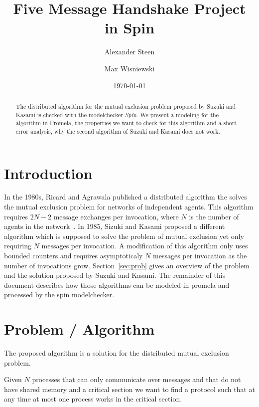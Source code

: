 \documentclass{llncs}
\title{Five Message Handshake Project in Spin}
\author{Alexander Steen \and Max Wisniewski}
\date{\today}
\institute{Institut f\"ur Informatik, FU Berlin}
\begin{document}
\maketitle

\begin{abstract}
The distributed algorithm for the mutual exclusion problem proposed by Suzuki and Kasami \cite{Suzuki:1985:DME:6110.214406} is checked
with the modelchecker \emph{Spin}. We present a modeling for the algorithm in Promela, the properties we want
to check for this algorithm and a short error analysis, why the second algorithm of Suzuki and Kasami does not work.
\end{abstract}



\section{Introduction}

In the 1980s, Ricard and Agrawala published a distributed algorithm the solves the mutual exclusion
problem for networks of independent agents. This algorithm requires $2N-2$ message exchanges per
invocation, where $N$ is the number of agents in the network~\cite{Ricart:1981:OAM:358527.358537}.
In 1985, Sizuki and Kasami proposed a different algorithm which is supposed to solve the problem of 
mutual exclusion yet only requiring $N$ messages per invocation. A modification of this algorithm
only uses bounded counters and requires asymptoticaly $N$ messages per invocation as the number of
invocations grow.
Section~\ref{sec:prob} gives an overview of the problem and the solution proposed by Suzuki and Kasami.
The remainder of this document describes how those algorithms can be modeled in promela and
processed by the spin modelchecker.

\section{Problem / Algorithm\label{sec:prob}}

The proposed algorithm is a solution for the distributed mutual exclusion problem.

Given $N$ processes that can only communicate over messages and that do not have shared memory
and a critical section we want to find a protocol such that at any time at most one process
works in the critical section.
\end{document}
